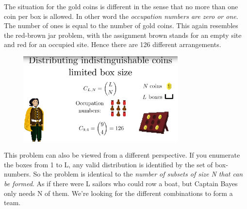 \documentclass[12pt, a4paper]{scrartcl}
\begin{document}
The situation for the gold coins is different in the sense that no more than one coin per box is allowed. In other word the \textit{occupation numbers are zero or one}. The number of ones is equal to the number of gold coins.%
 This again resembles the red-brown jar problem, with the assignment brown stands for an empty site and red for an occupied site. Hence there are 126 different arrangements.
 \begin{figure}[H]
	\centering
	\includegraphics[width=0.75\textwidth]{4_13.png}
\end{figure}
This problem can also be viewed from a different perspective. If you enumerate the boxes from 1 to L, any valid distribution is identified by the set of box-numbers. So the problem is identical to the \textit{number of subsets of size N that can be formed}. 
As if there were L sailors who could row a boat, but Captain Bayes only needs N of them. We're looking for the different combinations to form a team. \\
\end{document}
